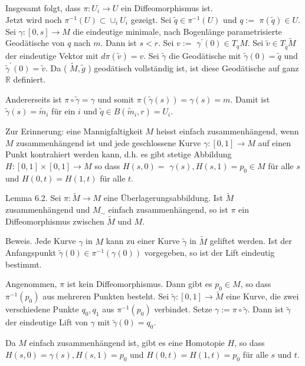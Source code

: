 \documentclass[10pt, letterpaper]{article}
\begin{document}
Insgesamt folgt, dass $\pi: U_{i} \rightarrow U$ ein Diffeomorphismus ist.\\
Jetzt wird noch $\pi^{-1}(U) \subset \cup_{i} U_{i}$ gezeigt. Sei $\tilde{q} \in \pi^{-1}(U)$ und $q:=$ $\pi(\tilde{q}) \in U$. Sei $\gamma:[0, s] \rightarrow M$ die eindeutige minimale, nach Bogenlänge parametrisierte Geodätische von $q$ nach $m$. Dann ist $s<r$. Sei $v:=$ $\gamma^{\prime}(0) \in T_{q} M$. Sei $\tilde{v} \in T_{\tilde{q}} \tilde{M}$ der eindeutige Vektor mit $d \pi(\tilde{v})=v$. Sei $\tilde{\gamma}$ die Geodätische mit $\tilde{\gamma}(0)=\tilde{q}$ und $\tilde{\gamma}^{\prime}(0)=\tilde{v}$. Da ( $\tilde{M}, \tilde{g}$ ) geodätisch vollständig ist, ist diese Geodätische auf ganz $\mathbb{R}$ definiert.

Andererseits ist $\pi \circ \tilde{\gamma}=\gamma$ und somit $\pi(\tilde{\gamma}(s))=\gamma(s)=m$. Damit ist $\tilde{\gamma}(s)=\tilde{m}_{i}$ für ein $i$ und $\tilde{q} \in B\left(\tilde{m}_{i}, r\right)=U_{i}$.

Zur Erinnerung: eine Mannigfaltigkeit $M$ heisst einfach zusammenhängend, wenn $M$ zusammenhängend ist und jede geschlossene Kurve $\gamma:[0,1] \rightarrow M$ auf einen Punkt kontrahiert werden kann, d.h. es gibt stetige Abbildung $H:[0,1] \times[0,1] \rightarrow M$ so dass $H(s, 0)=$ $\gamma(s), H(s, 1)=p_{0} \in M$ für alle $s$ und $H(0, t)=H(1, t)$ für alle $t$.

Lemma 6.2. Sei $\pi: \tilde{M} \rightarrow M$ eine Überlagerungsabbildung. Ist $\tilde{M}$ zusammenhängend und $M_{\sim}$ einfach zusammenhängend, so ist $\pi$ ein Diffeomorphismus zwischen $\tilde{M}$ und $M$.

Beweis. Jede Kurve $\gamma$ in $M$ kann zu einer Kurve $\tilde{\gamma}$ in $\tilde{M}$ geliftet werden. Ist der Anfangspunkt $\tilde{\gamma}(0) \in \pi^{-1}(\gamma(0))$ vorgegeben, so ist der Lift eindeutig bestimmt.

Angenommen, $\pi$ ist kein Diffeomorphismus. Dann gibt es $p_{0} \in M$, so dass $\pi^{-1}\left(p_{0}\right)$ aus mehreren Punkten besteht. Sei $\tilde{\gamma}:[0,1] \rightarrow \tilde{M}$ eine Kurve, die zwei verschiedene Punkte $q_{0}, q_{1}$ aus $\pi^{-1}\left(p_{0}\right)$ verbindet. Setze $\gamma:=\pi \circ \tilde{\gamma}$. Dann ist $\tilde{\gamma}$ der eindeutige Lift von $\gamma$ mit $\tilde{\gamma}(0)=q_{0}$.

Da $M$ einfach zusammenhängend ist, gibt es eine Homotopie $H$, so dass $H(s, 0)=\gamma(s), H(s, 1)=p_{0}$ und $H(0, t)=H(1, t)=p_{0}$ für alle $s$ und $t$.
\end{document}
